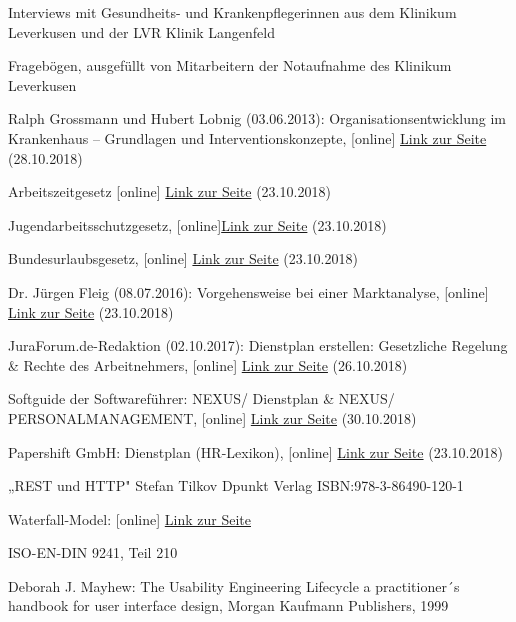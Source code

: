 \documentclass[11pt,
paper=a4,
bibtotocnumbered,	  %
liststotocnumbered,  %
DIV=calc,		  %
tablecaptionabove,	  %
headinclude,
]{article}
\begin{document}
\begin{description}
\item
Interviews mit Gesundheits- und Krankenpflegerinnen aus dem Klinikum Leverkusen und der LVR Klinik Langenfeld
\item
Fragebögen, ausgefüllt von Mitarbeitern der Notaufnahme des Klinikum Leverkusen
\item
Ralph Grossmann und Hubert Lobnig (03.06.2013): Organisationsentwicklung im Krankenhaus – Grundlagen und Interventionskonzepte, [online] \href{http://www.mwv-berlin.de/buecher-bestellen-2016/images/product_images/leseproben_images/9783954660025_Leseprobe.pdf}{Link zur Seite} (28.10.2018)
\item
Arbeitszeitgesetz [online] \href{https://www.gesetze-im-internet.de/arbzg/BJNR117100994.html}{Link zur Seite} (23.10.2018)
\item
Jugendarbeitsschutzgesetz, [online]\href{https://www.gesetze-im-internet.de/jarbschg/}{Link zur Seite} (23.10.2018)
\item
Bundesurlaubsgesetz, [online] \href{https://www.gesetze-im-internet.de/burlg/}{Link zur Seite} (23.10.2018)
\item
Dr. Jürgen Fleig (08.07.2016): Vorgehensweise bei einer Marktanalyse, [online] \href{https://www.business-wissen.de/hb/vorgehensweise-bei-einer-marktanalyse/}{Link zur Seite} (23.10.2018)
\item
JuraForum.de-Redaktion (02.10.2017): Dienstplan erstellen: Gesetzliche Regelung & Rechte des Arbeitnehmers, [online] \href{https://www.juraforum.de/ratgeber/arbeitsrecht/dienstplan-erstellen-gesetzliche-regelung-und-rechte-des-arbeitnehmers}{Link zur Seite} (26.10.2018)
\item
Softguide der Softwareführer: NEXUS/ Dienstplan & NEXUS/ PERSONALMANAGEMENT, [online] \href{https://www.softguide.de/programm/nexus-dienstplan}{Link zur Seite} (30.10.2018)
\item
Papershift GmbH: Dienstplan (HR-Lexikon), [online] \href{https://www.papershift.com/lexikon/dienstplan}{Link zur Seite} (23.10.2018)
\item
„REST und HTTP" Stefan Tilkov Dpunkt Verlag ISBN:978-3-86490-120-1
\item
Waterfall-Model: [online]
\href{https://upload.wikimedia.org/wikipedia/commons/thumb/e/e2/Waterfall_model.svg/1200px-Waterfall_model.svg.png}{Link zur Seite}
\item
ISO-EN-DIN 9241, Teil 210
\item
Deborah J. Mayhew: The Usability Engineering Lifecycle a practitioner´s handbook for user interface design, Morgan Kaufmann Publishers, 1999

\end{description}
\end{document}
